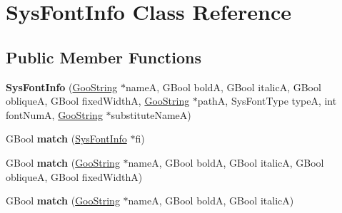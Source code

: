 \hypertarget{class_sys_font_info}{}\section{Sys\+Font\+Info Class Reference}
\label{class_sys_font_info}
\subsection*{Public Member Functions}
\begin{DoxyCompactItemize}
\item 
\mbox{\label{class_sys_font_info_a859aa7112825784f66f2982f767d973e}} 
{\bfseries Sys\+Font\+Info} (\hyperlink{class_goo_string}{Goo\+String} $\ast$nameA, G\+Bool boldA, G\+Bool italicA, G\+Bool obliqueA, G\+Bool fixed\+WidthA, \hyperlink{class_goo_string}{Goo\+String} $\ast$pathA, Sys\+Font\+Type typeA, int font\+NumA, \hyperlink{class_goo_string}{Goo\+String} $\ast$substitute\+NameA)
\item 
\mbox{\label{class_sys_font_info_a0478603c53cec2f5399ec07e441ec618}} 
G\+Bool {\bfseries match} (\hyperlink{class_sys_font_info}{Sys\+Font\+Info} $\ast$fi)
\item 
\mbox{\label{class_sys_font_info_aa3d6524110114cf81b27b7a8fc94b358}} 
G\+Bool {\bfseries match} (\hyperlink{class_goo_string}{Goo\+String} $\ast$nameA, G\+Bool boldA, G\+Bool italicA, G\+Bool obliqueA, G\+Bool fixed\+WidthA)
\item 
\mbox{\label{class_sys_font_info_aa69be30e1491d9dfb27cb42956265831}} 
G\+Bool {\bfseries match} (\hyperlink{class_goo_string}{Goo\+String} $\ast$nameA, G\+Bool boldA, G\+Bool italicA)
\end{DoxyCompactItemize}
